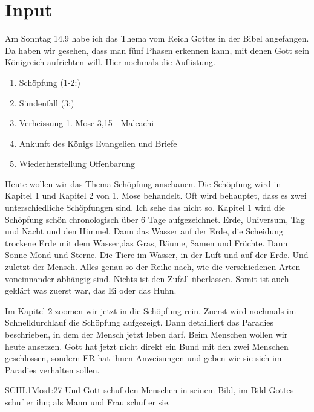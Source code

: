 \documentclass{../../inc/mybib}
\begin{document}
\section{ Input }
\begin{spacing}{1.5}    
    \begin{block}[Einleitung]
        Am Sonntag 14.9 habe ich das Thema vom Reich Gottes in der Bibel angefangen. Da haben wir gesehen, dass man fünf Phasen erkennen kann, mit denen Gott sein Königreich aufrichten will. Hier nochmals die Auflistung.
    \end{block}

    \begin{enumerate}
    \item Schöpfung  (1-2:)
    \item Sündenfall  (3:)
    \item Verheissung 1. Mose 3,15 - Maleachi
    \item Ankunft des Königs Evangelien und Briefe
    \item Wiederherstellung Offenbarung
   \end{enumerate}        
    \begin{block}
       Heute wollen wir das Thema Schöpfung anschauen. Die Schöpfung wird in Kapitel 1 und Kapitel 2 von 1. Mose behandelt. Oft wird behauptet, dass es zwei unterschiedliche Schöpfungen sind. Ich sehe das nicht so. Kapitel 1 wird die Schöpfung schön chronologisch über 6 Tage aufgezeichnet. Erde, Universum, Tag und Nacht und den Himmel. Dann das Wasser auf der Erde, die Scheidung trockene Erde mit dem Wasser,das Gras, Bäume, Samen und Früchte. Dann Sonne Mond und Sterne. Die Tiere im Wasser, in der Luft und auf der Erde. Und zuletzt der Mensch.
       Alles genau so der Reihe nach, wie die verschiedenen Arten voneinnander abhängig sind. Nichts ist den Zufall überlassen. Somit ist auch geklärt was zuerst war, das Ei oder das Huhn. 
    \end{block}

   \begin{block}
    Im Kapitel 2 zoomen wir jetzt in die Schöpfung rein. Zuerst wird nochmals im Schnelldurchlauf die Schöpfung aufgezeigt. Dann detailliert das Paradies beschrieben, in dem der Mensch jetzt leben darf. Beim Menschen wollen wir heute ansetzen. Gott hat jetzt nicht direkt ein Bund mit den zwei Menschen geschlossen, sondern ER hat ihnen Anweisungen und  geben wie sie sich im Paradies verhalten sollen. 
    \begin{bibelbox}{SCHL}{1Mos}{1:27}
        Und Gott schuf den Menschen in seinem Bild, im Bild Gottes schuf er ihn; als Mann und Frau schuf er sie.
    \end{bibelbox}


\end{block}
\end{spacing}
\end{document}
